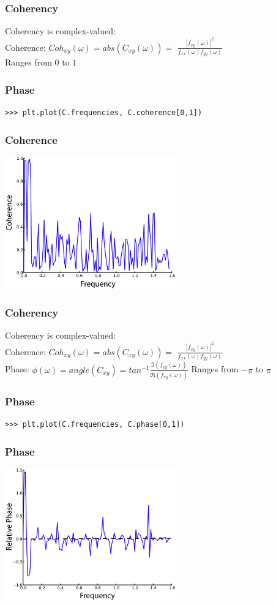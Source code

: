 \documentclass{beamer}
\begin{document}
\begin{frame}
\frametitle{Coherency}
Coherency is complex-valued:
\\
\vfill
\pause
Coherence: $Coh_{xy} (\omega) = abs(C_{xy}(\omega)) = $
\pause
$\frac{|f_{xy}(\omega)|^2}{f_{xx}(\omega)f_{yy}(\omega)}$
\pause 
\\
\vfill
Ranges from $0$ to $1$
\end{frame}

\begin{frame}[fragile]
\frametitle{Phase}
\begin{lstlisting}
>>> plt.plot(C.frequencies, C.coherence[0,1])
\end{lstlisting}
\end{frame}

\begin{frame}
\frametitle{Coherence}
\includegraphics[height=5.7cm]{figures/outa_phase_tseries_coh}
\end{frame}

\begin{frame}
\frametitle{Coherency}
Coherency is complex-valued:
\\
\vfill
Coherence: $Coh_{xy} (\omega) = abs(C_{xy}(\omega)) = $
$\frac{|f_{xy}(\omega)|^2}{f_{xx}(\omega)f_{yy}(\omega)}$
\\
\pause
\vfill
Phase: $\phi(\omega)= angle(C_{xy}) =
tan^{-1}\frac{\Im(f_{xy}(\omega))}{\Re(f_{xy}(\omega))}$
\vfill
\pause
Ranges from $-\pi$ to $\pi$
\end{frame}

\begin{frame}[fragile]
\frametitle{Phase}
\begin{lstlisting}
>>> plt.plot(C.frequencies, C.phase[0,1])
\end{lstlisting}
\end{frame}

\begin{frame}
\frametitle{Phase}
\includegraphics[height=5.7cm]{figures/outa_phase_tseries_ph}
\end{frame}
\end{document}
